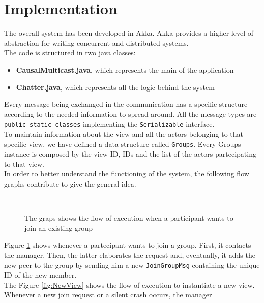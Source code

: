 \documentclass[conference]{IEEEtran}
\begin{document}
\section{Implementation}
The overall system has been developed in Akka. Akka provides a higher
level of abstraction for writing concurrent and distributed systems. \\
The code is structured in two java classes:
\begin{itemize}
	\item \textbf{CausalMulticast.java}, which represents the main of 
	the application 
	\item \textbf{Chatter.java}, which represents all the logic behind
	the system
\end{itemize}
Every message being exchanged in the communication has a specific
structure according to the needed information to spread around. 
All the message types are \texttt{public static classes}
implementing the \texttt{Serializable} interface.\\
To maintain information about the view and all the actors belonging
to that specific view, we have defined a data structure called \texttt{Groups}.
Every Groups instance is composed by the view ID, IDs and the list of the
actors partecipating to that view. \\
In order to better understand the functioning of the system, the 
following flow graphs contribute to give the general idea. \\
\begin{figure}[ht]%
	\centering
	\\%
	\caption{The graps shows the flow of execution when a participant
	wants to join an existing group}%
	\label{fig:join}%
\end{figure}
Figure \ref{fig:join} shows whenever a partecipant wants to join a 
group. First, it contacts the manager. Then, the latter elaborates the
request and, eventually, it adds the new peer to the group by sending
him a new \texttt{JoinGroupMsg} containing the unique ID of the new member. \\
The Figure \ref{fig:NewView} shows the flow of execution to instantiate a new view.
Whenever a new join request or a silent crash occurs, the manager
\end{document}
